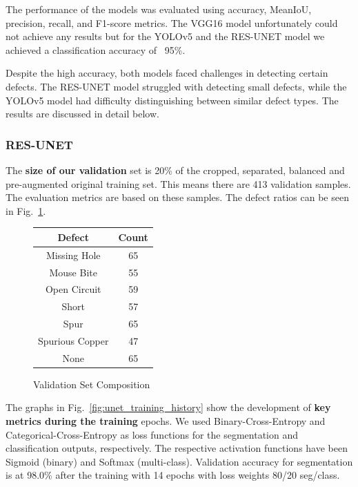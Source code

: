\documentclass[12pt]{article}
\begin{document}
The performance of the models was evaluated using accuracy, MeanIoU, precision, recall, and F1-score metrics. The VGG16 model unfortunately could not achieve any results but for the YOLOv5 and the RES-UNET model we achieved a classification accuracy of ~95\%.

Despite the high accuracy, both models faced challenges in detecting certain defects. The RES-UNET model struggled with detecting small defects, while the YOLOv5 model had difficulty distinguishing between similar defect types. The results are discussed in detail below.

\subsubsection{RES-UNET}

The {\bf size of our validation} set is 20\% of the cropped, separated, balanced and pre-augmented original training set. This means there are 413 validation samples. The evaluation metrics are based on these samples. The defect ratios can be seen in Fig.~\ref{fig:val_set}.
\begin{figure}[H]
    \begin{center}
        \begin{tabular}{|c|c|}
            \hline
            Defect & Count\\
            \hline
            Missing Hole & 65 \\
            Mouse Bite & 55 \\
            Open Circuit & 59 \\
            Short & 57 \\
            Spur & 65 \\
            Spurious Copper & 47 \\
            None & 65\\
            \hline
        \end{tabular}
    \end{center}
    \caption{Validation Set Composition}
    \label{fig:val_set}
\end{figure}

The graphs in Fig.~\ref{fig:unet_training_history} show the development of {\bf key metrics during the training} epochs. We used Binary-Cross-Entropy and Categorical-Cross-Entropy as loss functions for the segmentation and classification outputs, respectively. The respective activation functions have been Sigmoid (binary) and Softmax (multi-class). Validation accuracy for segmentation is at 98.0\% after the training with 14 epochs with loss weights 80/20 seg/class.
\end{document}
